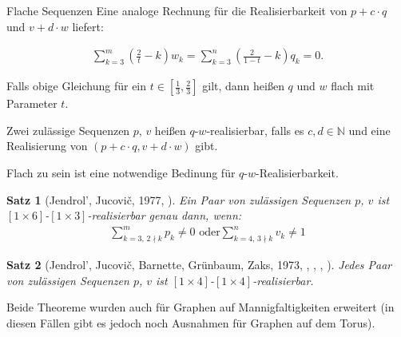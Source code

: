 \documentclass[10pt, notheorems]{beamer}
\newtheorem{theorem}{Satz}[section]
\newcommand{\nats}{\mathbb{N}}
\newcommand{\hdef}[1]{\textcolor{darkred2}{#1}}
\begin{document}
\begin{frame}{Flache Sequenzen}
  Eine analoge Rechnung für die Realisierbarkeit von $p+c\cdot q$ und $v+d\cdot w$ liefert:
  \begin{block}{}
    \begin{align*}
      \sum_{k=3}^m \left(\frac{2}{t} - k \right) w_k = \sum_{k=3}^n \left( \frac{2}{1-t} - k \right) q_k = 0.
    \end{align*}
  \end{block}
  \pause
  Falls obige Gleichung für ein $t \in \left[\tfrac{1}{3}, \tfrac{2}{3}\right]$ gilt, dann heißen $q$ und $w$ \hdef{flach mit Parameter $t$}.
  \pause
  \begin{definition}
    Zwei zulässige Sequenzen $p$, $v$ heißen \hdef{$q$-$w$-realisierbar}, falls es $c, d \in \nats$ und eine Realisierung von $(p + c \cdot q, v + d \cdot w)$ gibt.
  \end{definition}
  \pause
  Flach zu sein ist eine notwendige Bedinung für $q$-$w$-Realisierbarkeit.
\end{frame}

\begin{frame}
  \begin{theorem}[{\sc Jendrol', Jucovi{\v{c}}}, 1977, \cite{jendrol1977generalization}] \label{thm:eberhard:extended:3}
    Ein Paar von zulässigen Sequenzen $p$, $v$ ist $[1 \times 6]$-$[1 \times 3]$-realisierbar genau dann, wenn:
    \begin{align*}
      \sum_{k=3,\,2 \nmid k}^{m} p_k \neq 0 \text{ oder} \sum_{k=4,\,3 \nmid k}^n v_k \neq 1
    \end{align*}
  \end{theorem}
  \pause
  \begin{theorem}[{\sc Jendrol', Jucovi{\v{c}}, Barnette, Grünbaum, Zaks}, 1973, \cite{jucovivc1973theorem}, \cite{barnette1971toroidal}, \cite{grunbaum1969planar}, \cite{zaks1971analogue}] \label{thm:eberhard:extended:4}
    Jedes Paar von zulässigen Sequenzen $p$, $v$ ist $[1 \times 4]$-$[1 \times 4]$-realisierbar.
  \end{theorem}
  \pause
  Beide Theoreme wurden auch für Graphen auf Mannigfaltigkeiten erweitert (in diesen Fällen gibt es jedoch noch Ausnahmen für Graphen auf dem Torus).
\end{frame}
\end{document}
